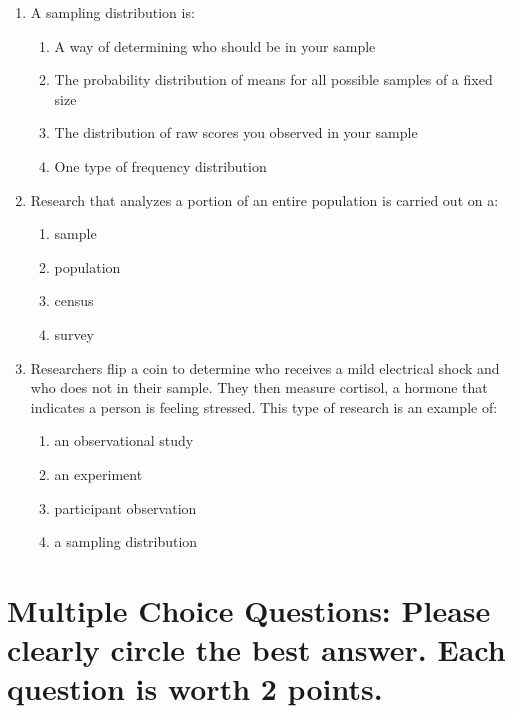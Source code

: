 \documentclass{article}
\begin{document}
\begin{enumerate}[label=\textbf{Q\arabic*:}]
    \item A sampling distribution is:
    \begin{enumerate}[label=\alph*)]
        \item A way of determining who should be in your sample
        \item The probability distribution of means for all possible samples of a fixed size
        \item The distribution of raw scores you observed in your sample
        \item One type of frequency distribution
    \end{enumerate}

    \item Research that analyzes a portion of an entire population is carried out on a:
    \begin{enumerate}[label=\alph*)]
        \item sample
        \item population
        \item census
        \item survey
    \end{enumerate}

    \item Researchers flip a coin to determine who receives a mild electrical shock and who does not in their sample. They then measure cortisol, a hormone that indicates a person is feeling stressed. This type of research is an example of:
    \begin{enumerate}[label=\alph*)]
        \item an observational study
        \item an experiment
        \item participant observation
        \item a sampling distribution
    \end{enumerate}

\end{enumerate}


\section*{Multiple Choice Questions: Please clearly circle the best answer. Each question is worth 2 points.}
\end{document}

